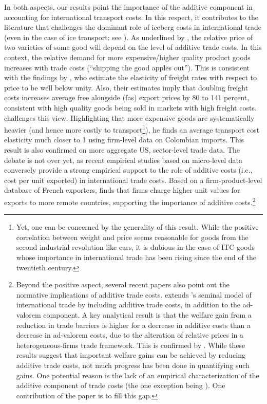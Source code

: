 \documentclass[a4paper,11pt]{article}
\begin{document}
In both aspects, our results point the importance of the additive component in accounting for international transport costs. In this respect, it contributes to the literature that challenges the dominant role of iceberg costs in international trade (even in the case of ice transport: see \citealp{bosker2018ice}). As underlined by \cite{alchian}, the relative price of two varieties of some good will depend on the level of additive trade costs. In this context, the relative demand for more expensive/higher quality product goods increases with trade costs (``shipping the good apples out''). This is consistent with the findings by \citet{hummels_skiba}, who estimate the elasticity of freight rates with respect to price to be well below unity. Also, their estimates imply that doubling freight costs increases average free alongside (fas) export prices by 80 to 141 percent, consistent with high quality goods being sold in markets with high freight costs. \citet{Lashkaripour-mimeo-2017} challenges this view. Highlighting that more expensive goods are systematically heavier (and hence more costly to transport\footnote{Yet, one can be concerned by the generality of this result. While the positive correlation between weight and price seems reasonable for goods from the second industrial revolution like cars, it is dubious in the case of ITC goods whose importance in international trade has been rising since the end of the twentieth century.}), he finds an average transport cost elasticity much closer to 1 using firm-level data on Colombian imports. This result is also confirmed on more aggregate US, sector-level trade data. The debate is not over yet, as recent empirical studies based on micro-level data conversely provide a strong empirical support to the role of additive costs (i.e., cost per unit exported) in international trade costs. Based on a firm-product-level database of French exporters, \citet{martin2012} finds that firms charge higher unit values for exports to more remote countries, supporting the importance of additive costs.\footnote{Beyond the positive aspect, several recent papers also point out the normative implications of additive trade costs. \citet{sorensen2014} extends \citet{melitz}'s seminal model of international trade by including additive trade costs, in addition to the ad-valorem component. A key analytical result is that the welfare gain from a reduction in trade barriers is higher for a decrease in additive costs than a decrease in ad-valorem costs, due to the alteration of relative prices in a heterogeneous-firms trade framework. This is confirmed by \cite{Irrazabal_2015}. While these results suggest that important welfare gains can be achieved by reducing additive trade costs, not much progress has been done in quantifying such gains. One potential reason is the lack of an empirical characterization of the additive component of trade costs (the one exception being \citet{Irrazabal_2015}). One contribution of the paper is to fill this gap.}
\end{document}
